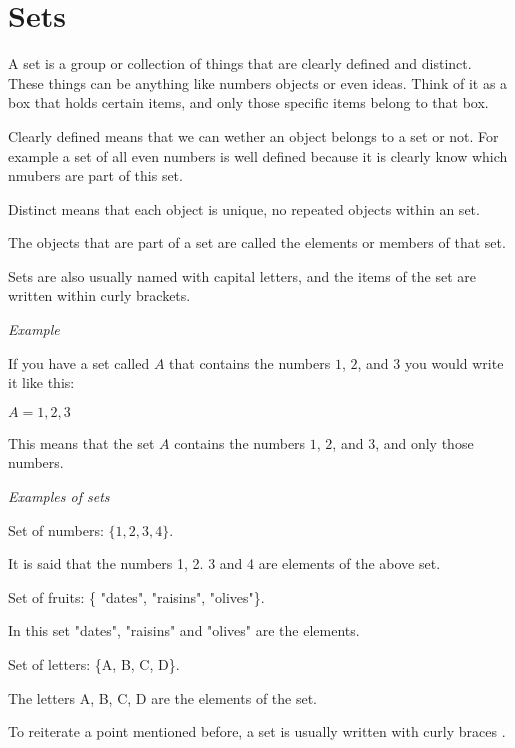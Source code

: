 \documentclass[]{book}
\begin{document}
\section{Sets}

A set is a group or collection of things that are clearly defined and distinct. These things can be anything like numbers objects or even ideas.
Think of it as 
a box that holds certain items, and only those specific items belong to that box.

Clearly defined means that we can wether an object belongs to a set or not. For example a set of all even numbers is well defined because it is 
clearly know which nmubers are part of this set.

Distinct means that each object is unique, no repeated objects within an set.

The objects that are part of a set are called the elements or members of that set. 


Sets are also usually named with capital letters, and the items of the set are written within curly brackets.

\vspace{0.5 cm}
\textit{Example}

If you have a set called $A$ that contains the numbers $1$, $2$, and $3$ you would write it like this:

$A={1,2,3}$

This means that the set $A$ contains the numbers $1$, $2$, and $3$, and only those numbers.


\vspace{0.5 cm}
\textit{Examples of sets}

Set of numbers: $\{1, 2, 3, 4\}$.

It is said that the numbers 1, 2. 3 and 4 are elements of the above set. 


\vspace{0.5 cm}
Set of fruits: \{ "dates", "raisins", "olives"\}.

In this set "dates", "raisins" and "olives" are the elements.


\vspace{0.5 cm}
Set of letters: \{A, B, C, D\}.

The letters A, B, C, D are the elements of the set.


To reiterate a point mentioned before, a set is usually written with curly braces {}. 
\end{document}

